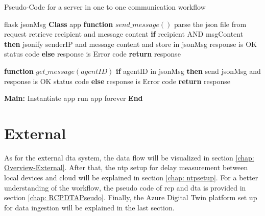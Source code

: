     \begin{algorithm}
        \caption{Pseudo-Code for a server in one to one communication workflow}
        \label{alg: apiServerPseudoCode}
        \begin{algorithmic}[1]
         flask
         jsonMsg 
        \State \textbf{Class} app
            \State \qquad \textbf{function} {$send\_message()$}
            \State \qquad {} 
            \State \qquad \qquad parse the json file from request
            \State \qquad \qquad retrieve recipient and message content 
            \State \qquad \qquad \textbf{if} recipient AND msgContent \textbf{then}
            \State \qquad \qquad \qquad jsonify senderIP and message content and store in jsonMsg
            \State \qquad \qquad \qquad response is OK status code
            \State \qquad \qquad \textbf{else}            
            \State \qquad \qquad \qquad response is Error code            
            \State \qquad \qquad \textbf{return} response  

            \State \qquad \textbf{function} {$get\_message(agentID)$}  
            \State \qquad {} 
            \State \qquad \qquad \textbf{if} agentID in jsonMsg \textbf{then}
            \State \qquad \qquad \qquad send jsonMsg and response is OK status code
            \State \qquad \qquad \textbf{else}
            \State \qquad \qquad \qquad response is Error code
            \State \qquad \qquad \textbf{return} response         
    
        \State \textbf{Main:}
        \State \qquad Instantiate app
        \State \qquad run app forever
        \State \textbf{End} 
        \end{algorithmic}
        \end{algorithm}

\section{External} \label{chap: Meth-External}
As for the external \gls{dta} system, the data flow will be visualized in section \ref{chap: Overview-External}.
After that, the \gls{ntp} setup for delay measurement between local devices and cloud will
be explained in section \ref{chap: ntpsetup}. For a better understanding of the workflow, 
the pseudo code of \gls{rcp} and \gls{dta} is provided in section \ref{chap: RCPDTAPseudo}. 
Finally, the Azure Digital Twin platform set up for data ingestion will be explained
in the last section.




